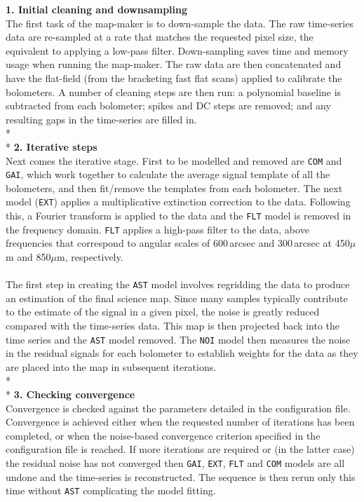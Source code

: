 \documentclass[twoside,11pt]{article}
\renewcommand{\_}{\texttt{\symbol{95}}}
\newcommand{\model}[1]{\texttt{#1}}
\begin{document}
\begin{center}
\begin{minipage}[t]{0.95\linewidth}
\textbf{1. Initial cleaning and downsampling}\\
The first task of the map-maker is to down-sample the data. The
raw time-series data are re-sampled at a rate that matches the
requested pixel size, the equivalent to applying a low-pass filter.
Down-sampling saves time and memory usage when running the map-maker.
The raw data are then concatenated and have the flat-field (from the
bracketing fast flat scans) applied to calibrate the bolometers. A
number of cleaning steps are then run: a polynomial baseline is
subtracted from each bolometer; spikes and DC steps are removed; and
any resulting gaps in the time-series are filled in.
\\*\\*
\textbf{2. Iterative steps}\\
Next comes the iterative stage. First to be modelled
and removed are \model{COM} and \model{GAI}, which work together to
calculate the average signal template of all the bolometers, and then
fit/remove the templates from each bolometer. The next model
(\model{EXT}) applies a multiplicative extinction correction to the
data. Following this, a Fourier transform is applied to the data and
the \model{FLT} model is removed in the frequency domain.
\model{FLT} applies a high-pass filter to the data, above frequencies
that correspond to angular scales of 600\,arcsec and 300\,arcsec at
450$\mu$m and 850$\mu$m, respectively.
\\\\
The first step in creating the  \model{AST} model involves
regridding the data to produce an estimation of the final science map.
Since many samples typically contribute to the estimate of the signal
in a given pixel, the noise is greatly reduced compared with the
time-series data. This map is then projected back into the time series
and the \model{AST} model removed. The \model{NOI} model then
measures the noise in the residual signals for each bolometer to
establish weights for the data as they are placed into the map in
subsequent iterations.
\\*\\*
\textbf{3. Checking convergence}\\
Convergence is checked against the parameters detailed
in the configuration file. Convergence is achieved either when the
requested number of iterations has been completed, or when the
noise-based convergence criterion specified in the configuration file
is reached. If more iterations are required or (in the latter case)
the residual noise has not converged then \model{GAI}, \model{EXT},
\model{FLT} and \model{COM} models are all undone and the
time-series is reconstructed. The sequence is then rerun only this
time without \model{AST} complicating the model fitting.
\end{minipage}
\end{center}
\end{document}
